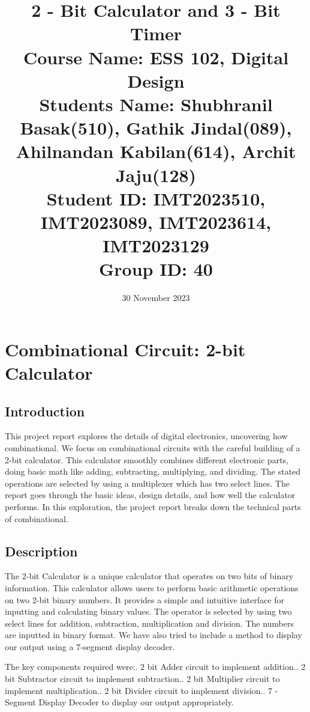 \documentclass[a4paper,10pt]{article}
\title{\Large\textbf{2 - Bit Calculator and 3 - Bit Timer} \\
    \normalsize Course Name: ESS 102, Digital Design \\ %

    \normalsize Students Name: Shubhranil Basak(510), Gathik Jindal(089), Ahilnandan Kabilan(614), Archit Jaju(128) \\ %
    \normalsize Student ID: IMT2023510, IMT2023089, IMT2023614, IMT2023129\\ %
    \normalsize Group ID: 40 \\%
    }
\date{30 November 2023} %
\begin{document}
\maketitle
\thispagestyle{fancy} 

\section{Combinational Circuit: 2-bit Calculator}

\subsection{Introduction}
This project report explores the details of digital electronics, uncovering how combinational. We focus on combinational circuits with the careful building of a 2-bit calculator. This calculator smoothly combines different electronic parts, doing basic math like adding, subtracting, multiplying, and dividing. The stated operations are selected by using a multiplexer which has two select lines. The report goes through the basic ideas, design details, and how well the calculator performs. In this exploration, the project report breaks down the technical parts of combinational.

\subsection{Description}
The 2-bit Calculator is a unique calculator that operates on two bits of binary information. This calculator allows users to perform basic arithmetic operations on two 2-bit binary numbers. It provides a simple and intuitive interface for inputting and calculating binary values. The operator is selected by using two select lines for addition, subtraction, multiplication and division. The numbers are inputted in binary format. We have also tried to include a method to display our output using a 7-segment display decoder.

The key components required were:. 2 bit Adder circuit to implement addition.. 2 bit Subtractor circuit to implement subtraction.. 2 bit Multiplier circuit to implement multiplication.. 2 bit Divider circuit to implement division.. 7 - Segment Display Decoder to display our output appropriately.\newline
\end{document}
